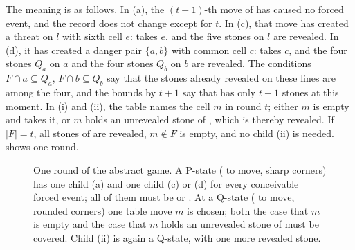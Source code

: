 The meaning is as follows. In \textup{(a)}, the $(t+1)$-th move of \Maker{} has caused no forced event, and the
record does not change except for $t$. In \textup{(c)}, that move has created a threat on $l$ with sixth
cell $e$: \Breaker{} takes $e$, and the five stones on $l$ are revealed. In \textup{(d)}, it has created a
danger pair $\{a,b\}$ with common cell $c$: \Breaker{} takes $c$, and the four stones $Q_a$ on $a$ and the
four stones $Q_b$ on $b$ are revealed. The conditions $F\cap a\subseteq Q_a$, $F\cap b\subseteq Q_b$ say that
the stones already revealed on these lines are among the four, and the bounds by $t+1$ say that \Maker{}
has only $t+1$ stones at this moment. In \textup{(i)} and \textup{(ii)}, the table names the cell $m$ in round
$t$; either $m$ is empty and \Breaker{} takes it, or $m$ holds an unrevealed stone of \Maker, which is thereby
revealed. If $|F|=t$, all stones of \Maker{} are revealed, $m\notin F$ is empty, and no child \textup{(ii)} is
needed.  shows one round.

\begin{figure}[t]
\centering
{}
\caption{One round of the abstract game. A P-state (\Maker{} to move, sharp corners) has one child \textup{(a)}
and one child \textup{(c)} or \textup{(d)} for every conceivable forced event; all of them must be \WON{} or
\VOID. At a Q-state (\Breaker{} to move, rounded corners) one table move $m$ is chosen; both the case that $m$
is empty and the case that $m$ holds an unrevealed stone of \Maker{} must be covered. Child \textup{(ii)} is
again a Q-state, with one more revealed stone.}
\label{fig:round}
\end{figure}


